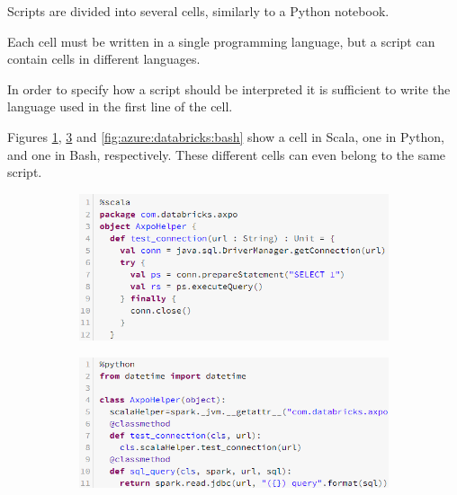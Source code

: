     Scripts are divided into several cells, similarly to a Python notebook.
    
    Each cell must be written in a single programming language, but a script can contain cells in different languages.
    
    In order to specify how a script should be interpreted it is sufficient to write the language used in the first line of the cell.
    
    Figures \ref{fig:azure:databricks:scala}, \ref{fig:azure:databricks:python} and \ref{fig:azure:databricks:bash} show a cell in Scala, one in Python, and one in Bash, respectively.
    These different cells can even belong to the same script.

    \begin{figure}
        \centering
        \begin{subfigure}{0.4\textwidth}
            \includegraphics[width=\textwidth]{res/azure/databricks/scala.png}
            \label{fig:azure:databricks:scala}
        \end{subfigure}
        
        \begin{subfigure}{0.4\textwidth}
            \includegraphics[width=\textwidth]{res/azure/databricks/python.png}
            \label{fig:azure:databricks:python}
        \end{subfigure}
        

\end{figure}
